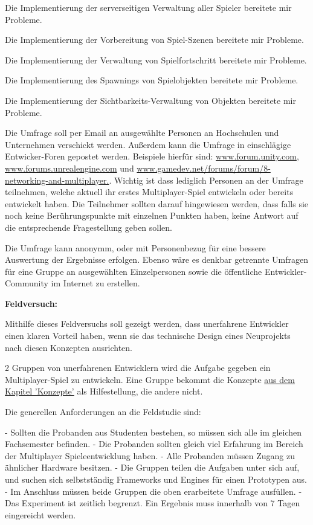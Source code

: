 Die Implementierung der serverseitigen Verwaltung aller Spieler bereitete mir Probleme.

Die Implementierung der Vorbereitung von Spiel-Szenen bereitete mir Probleme.

Die Implementierung der Verwaltung von Spielfortschritt bereitete mir Probleme.

Die Implementierung des Spawnings von Spielobjekten bereitete mir Probleme.

Die Implementierung der Sichtbarkeits-Verwaltung von Objekten bereitete mir Probleme.

Die Umfrage soll per Email an ausgewählte Personen an Hochschulen und Unternehmen verschickt werden. Außerdem kann die Umfrage in einschlägige Entwicker-Foren gepostet werden. Beispiele hierfür sind: \href{www.forum.unity.com}{www.forum.unity.com}, \href{www.forums.unrealengine.com}{www.forums.unrealengine.com} und \href{www.gamedev.net/forums/forum/8-networking-and-multiplayer}{www.gamedev.net/forums/forum/8-networking-and-multiplayer.}. Wichtig ist dass lediglich Personen an der Umfrage teilnehmen, welche aktuell ihr erstes Multiplayer-Spiel entwickeln oder bereits entwickelt haben. Die Teilnehmer sollten darauf hingewiesen werden, dass falls sie noch keine Berührungspunkte mit einzelnen Punkten haben, keine Antwort auf die entsprechende Fragestellung geben sollen.

Die Umfrage kann anonymm, oder mit Personenbezug für eine bessere Auswertung der Ergebnisse erfolgen. Ebenso wäre es denkbar getrennte Umfragen für eine Gruppe an ausgewählten Einzelpersonen sowie die öffentliche Entwickler-Community im Internet zu erstellen.

\textbf{Feldversuch:}

Mithilfe dieses Feldversuchs soll gezeigt werden, dass unerfahrene Entwickler einen klaren Vorteil haben, wenn sie das technische Design eines Neuprojekts nach diesen Konzepten ausrichten. 

2 Gruppen von unerfahrenen Entwicklern wird die Aufgabe gegeben ein Multiplayer-Spiel zu entwickeln. Eine Gruppe bekommt die Konzepte \hyperref[sec:konzepte]{aus dem Kapitel 'Konzepte'} als Hilfestellung, die andere nicht.

Die generellen Anforderungen an die Feldstudie sind:

- Sollten die Probanden aus Studenten bestehen, so müssen sich alle im gleichen Fachsemester befinden.
- Die Probanden sollten gleich viel Erfahrung im Bereich der Multiplayer Spieleentwicklung haben.
- Alle Probanden müssen Zugang zu ähnlicher Hardware besitzen.
- Die Gruppen teilen die Aufgaben unter sich auf, und suchen sich selbstständig Frameworks und Engines für einen Prototypen aus.
- Im Anschluss müssen beide Gruppen die oben erarbeitete Umfrage ausfüllen.
- Das Experiment ist zeitlich begrenzt. Ein Ergebnis muss innerhalb von 7 Tagen eingereicht werden.

